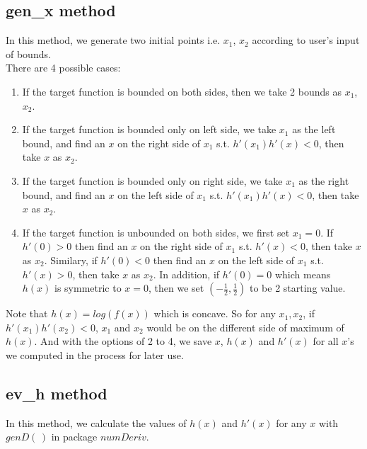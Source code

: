 \documentclass[11pt, oneside]{article}   	%
\begin{document}
\subsection*{ gen\_x method }
In this method, we generate two initial points i.e. $x_{1}$, $x_{2}$ according to user's input of bounds. \\
There are 4 possible cases:
  \begin{enumerate}
  \item  If the target function is bounded on both sides, then we take 2 bounds as $x_{1}$, $x_{2}$.
  \item  If the target function is bounded only on left side,  we take $x_{1}$ as the left bound, and find an $x$ on the right side of $x_{1}$ s.t. $h'(x_{1})h'(x)<0$, then take $x$ as $x_{2}$.
  \item  If the target function is bounded only on right side, we take  $x_{1}$ as the right bound, and find an $x$ on the left side of $x_{1}$ s.t. $h'(x_{1})h'(x)<0$, then take $x$ as  $x_{2}$.
  \item  If the target function is unbounded on both sides, we first set $x_{1}=0$. If $h'(0)>0$ then find an $x$ on the right side of $x_{1}$ s.t. $h'(x)<0$, then take $x$ as $x_{2}$. Similary, if $h'(0)<0$ then find an $x$ on the left side of $x_{1}$ s.t. $h'(x)>0$, then take $x$ as  $x_{2}$. In addition, if $h'(0)=0$ which means $h(x)$ is symmetric to $x=0$, then we set $(-\frac{1}{2},\frac{1}{2})$ to be 2 starting value.
 \end{enumerate}
Note that $h(x)=log(f(x))$ which is concave. So for any $x_1, x_2$, if $h'(x_1)h'(x_2)<0$, $x_1$ and $x_2$ would be on the different side of maximum of $h(x)$. And with the options of 2 to 4, we save $x$, $h(x)$ and $h'(x)$ for all $x$'s we computed in the process for later use.


\subsection*{ ev\_h method }
In this method, we calculate the values of $h(x)$ and $h'(x)$ for any $x$ with $genD(\,)$ in package $numDeriv$.
\end{document}

